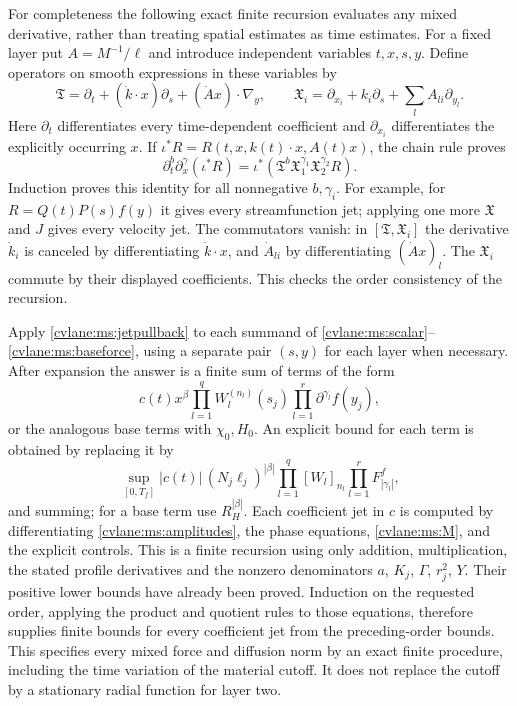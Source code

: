 For completeness the following exact finite recursion evaluates any
mixed derivative, rather than treating spatial estimates as time
estimates. For a fixed layer put $A=M^{-1}/\ell$ and introduce
independent variables $t,x,s,y$. Define operators on smooth
expressions in these variables by
\begin{equation}\label{cvlane:ms:jetops}
 \mathfrak T=\partial_t+(\dot k\cdot x)\partial_s
                          +(\dot A x)\cdot\nabla_y,
 \qquad
 \mathfrak X_i=\partial_{x_i}+k_i\partial_s+
                              \sum_l A_{li}\partial_{y_l}.
\end{equation}
Here $\partial_t$ differentiates every time-dependent coefficient
and $\partial_{x_i}$ differentiates the explicitly occurring $x$.
If $\iota^*R=R(t,x,k(t)\cdot x,A(t)x)$, the chain rule proves
\begin{equation}\label{cvlane:ms:jetpullback}
 \partial_t^b\partial_x^\gamma(\iota^*R)
       =\iota^*(\mathfrak T^b\mathfrak X_1^{\gamma_1}
                                         \mathfrak X_2^{\gamma_2}R).
\end{equation}
Induction proves this identity for all nonnegative $b,\gamma_i$.
For example, for $R=Q(t)P(s)f(y)$ it gives every streamfunction
jet; applying one more $\mathfrak X$ and $J$ gives every velocity
jet. The commutators vanish: in $[\mathfrak T,\mathfrak X_i]$
the derivative $\dot k_i$ is canceled by differentiating
$\dot k\cdot x$, and $\dot A_{li}$ by differentiating
$(\dot A x)_l$. The $\mathfrak X_i$ commute by their displayed
coefficients. This checks the order consistency of the recursion.

Apply \eqref{cvlane:ms:jetpullback} to each summand of
\eqref{cvlane:ms:scalar}--\eqref{cvlane:ms:baseforce}, using a separate pair
$(s,y)$ for each layer when necessary. After expansion the answer
is a finite sum of terms of the form
\[
 c(t)x^\beta\prod_{l=1}^q W_l^{(n_l)}(s_j)
                         \prod_{l=1}^r\partial^{\gamma_l}f(y_j),
\]
or the analogous base terms with $\chi_0,H_0$. An explicit bound
for each term is obtained by replacing it by
\[
 \sup_{[0,T_f]}|c(t)|\,(N_j\ell_j)^{|\beta|}
          \prod_{l=1}^q[W_l]_{n_l}
          \prod_{l=1}^r F^f_{|\gamma_l|},
\]
and summing; for a base term use $R_H^{|\beta|}$.
Each coefficient jet in $c$ is computed by differentiating
\eqref{cvlane:ms:amplitudes}, the phase equations, \eqref{cvlane:ms:M}, and
the explicit controls. This is a finite recursion using only
addition, multiplication, the stated profile derivatives and the
nonzero denominators $a$, $K_j$, $\Gamma$, $r_j^2$, $Y$.
Their positive lower bounds have already been proved. Induction
on the requested order, applying the product and quotient rules
to those equations, therefore supplies finite bounds for every
coefficient jet from the preceding-order bounds. This specifies
every mixed force and diffusion norm by an exact finite procedure,
including the time variation of the material cutoff. It does not
replace the cutoff by a stationary radial function for layer two.

